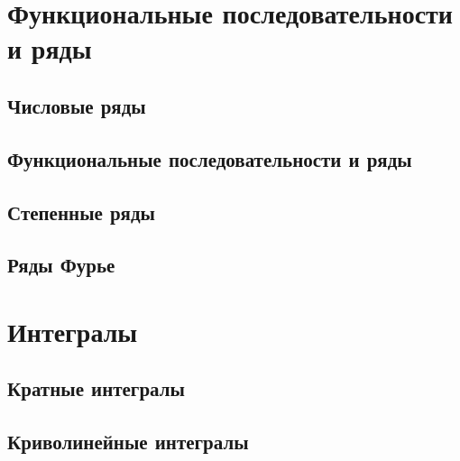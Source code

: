\documentclass[a4paper,12pt]{book}
\theoremstyle{plain}
\theoremstyle{definition}
\theoremstyle{remark}
\begin{document}
  
  \tableofcontents

  \part{Функциональные последовательности и ряды}
  \chapter{Числовые ряды}
  
  \chapter{Функциональные последовательности и ряды}
  
  \chapter{Степенные ряды}
  
  \chapter{Ряды Фурье}
  
  \part{Интегралы}
  \chapter{Кратные интегралы}
  
  \chapter{Криволинейные интегралы}
  
\end{document}
